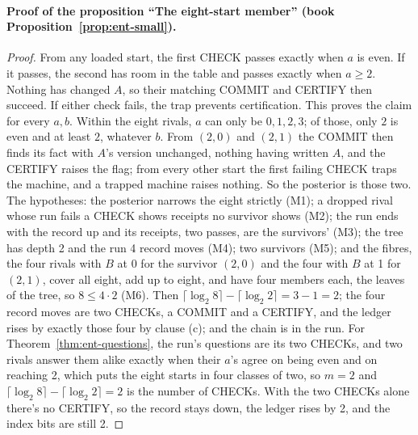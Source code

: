 \documentclass[11pt,twoside]{article}
\theoremstyle{thielethm}
\theoremstyle{thieledef}
\theoremstyle{thieledef}
\theoremstyle{thieledef}
\theoremstyle{thielethm}
\theoremstyle{thieleobs}
\theoremstyle{thielethm}
\begin{document}
\paragraph{Proof of the proposition ``The eight-start member'' (book Proposition~\ref{prop:ent-small}).}
\begin{proof}
From any loaded start, the first CHECK passes exactly when $a$ is even.
If it passes, the second has room in the table and passes exactly when $a\ge2$.
Nothing has changed $A$, so their matching COMMIT and CERTIFY then succeed.
If either check fails, the trap prevents certification. This proves the
claim for every $a,b$. Within the eight rivals, $a$ can only be $0,1,2,3$;
of those, only $2$ is even and at least $2$, whatever $b$. From $(2, 0)$ and $(2, 1)$ the
COMMIT then finds its fact with $A$'s version unchanged, nothing having written $A$, and the CERTIFY
raises the flag; from every other start the first failing CHECK traps the machine, and a trapped
machine raises nothing. So the posterior is those two. The hypotheses: the posterior narrows the
eight strictly (M1); a dropped rival whose run fails a CHECK shows receipts no survivor shows (M2);
the run ends with the record up and its receipts, two passes, are the survivors' (M3); the tree has
depth 2 and the run 4 record moves (M4); two survivors (M5); and the fibres, the four rivals with
$B$ at 0 for the survivor $(2, 0)$ and the four with $B$ at 1 for $(2, 1)$, cover all eight, add up
to eight, and have four members each, the leaves of the tree, so $8 \le 4 \cdot 2$ (M6). Then
$\lceil \log_2 8 \rceil - \lceil \log_2 2 \rceil = 3 - 1 = 2$; the four record moves are two
CHECKs, a COMMIT and a CERTIFY, and the ledger rises by exactly those four by clause (c); and the
chain is in the run. For Theorem~\ref{thm:ent-questions}, the run's questions are its two CHECKs,
and two rivals answer them alike exactly when their $a$'s agree on being even and on reaching 2,
which puts the eight starts in four classes of two, so $m = 2$ and
$\lceil \log_2 8 \rceil - \lceil \log_2 2 \rceil = 2$ is the number of CHECKs. With the two
CHECKs alone there's no CERTIFY, so the record stays down, the ledger rises by 2, and the index
bits are still 2.
\end{proof}
\end{document}
